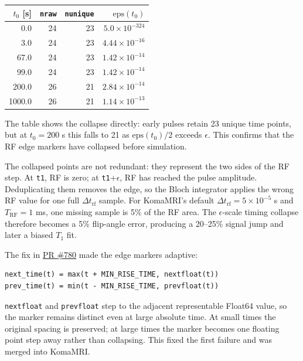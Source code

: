 \begin{table}
\vspace{-\baselineskip}
\begingroup
\small
\setlength{\tabcolsep}{4pt}
\setlength{\columnsep}{10pt}
\centering
\begin{tabular}{rrrr}
\toprule
$t_0$ [s] & \texttt{nraw} & \texttt{nunique} & $\mathrm{eps}(t_0)$ \\
\midrule
0.0    & 24 & 23 & $5.0{\times}10^{-324}$ \\
3.0    & 24 & 23 & $4.44{\times}10^{-16}$ \\
67.0   & 24 & 23 & $1.42{\times}10^{-14}$ \\
99.0   & 24 & 23 & $1.42{\times}10^{-14}$ \\
200.0  & 26 & 21 & $2.84{\times}10^{-14}$ \\
1000.0 & 26 & 21 & $1.14{\times}10^{-13}$ \\
\bottomrule
\end{tabular}
\endgroup
\vspace{-0.5\baselineskip}
\end{table}

The table shows the collapse directly: early pulses retain 23 unique time
points, but at $t_0=200$ s this falls to 21 as
$\mathrm{eps}(t_0)/2$ exceeds $\epsilon$. This confirms that the RF edge
markers have collapsed before simulation.

The collapsed points are not redundant: they represent the two sides of the RF
step. At \texttt{t1}, RF is zero; at \texttt{t1}+$\epsilon$, RF has reached
the pulse amplitude. Deduplicating them removes the edge, so the Bloch
integrator applies the wrong RF value for one full $\Delta t_\mathrm{rf}$
sample. For KomaMRI's default $\Delta t_\mathrm{rf}=5\times10^{-5}$ s and
$T_\mathrm{RF}=1$ ms, one missing sample is 5\% of the RF area. The
$\epsilon$-scale timing collapse therefore becomes a 5\% flip-angle error, producing a
20--25\% signal jump and later a biased $T_1$ fit.

The fix in \href{https://github.com/JuliaHealth/KomaMRI.jl/pull/780}{PR
\#780} made the edge markers adaptive:

\begin{verbatim}
next_time(t) = max(t + MIN_RISE_TIME, nextfloat(t))
prev_time(t) = min(t - MIN_RISE_TIME, prevfloat(t))
\end{verbatim}

\texttt{nextfloat} and \texttt{prevfloat} step to the adjacent representable
Float64 value, so the marker remains distinct even at large absolute time. At
small times the original spacing is preserved; at large times the marker
becomes one floating point step away rather than collapsing. This fixed the
first failure and was merged into KomaMRI.

